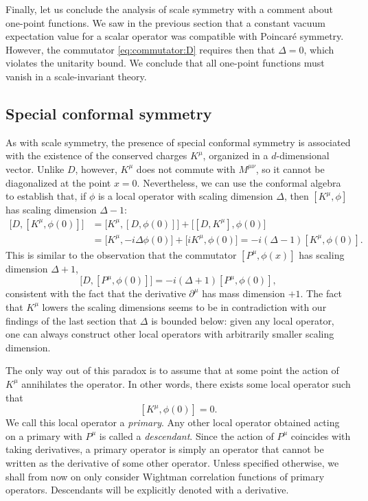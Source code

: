\documentclass[a4paper,12pt]{article}
\numberwithin{equation}{section}
\begin{document}
Finally, let us conclude the analysis of scale symmetry with a comment about one-point functions. We saw in the previous section that a constant vacuum expectation value for a scalar operator was compatible with Poincaré symmetry. However, the commutator \eqref{eq:commutator:D} requires then that $\Delta = 0$, which violates the unitarity bound.
We conclude that all one-point functions must vanish in a scale-invariant theory.


\subsection{Special conformal symmetry}

As with scale symmetry, the presence of special conformal symmetry is associated with the existence of the conserved charges $K^\mu$, organized in a $d$-dimensional vector.
Unlike $D$, however, $K^\mu$ does not commute with $M^{\mu\nu}$, so it cannot be diagonalized at the point $x = 0$.
Nevertheless, we can use the conformal algebra to establish that, if $\phi$ is a local operator with scaling dimension $\Delta$, then $\left[ K^\mu, \phi \right]$ has scaling dimension $\Delta - 1$:
\begin{align}
	\big[ D, [ K^\mu, \phi(0) ] \big]
	&= \big[ K^\mu, [ D, \phi(0) ] \big]
	+ \big[ [ D, K^\mu ], \phi(0) \big]
	\nonumber \\
	&= \big[ K^\mu, -i \Delta \phi(0) \big]
	+ \big[ i K^\mu, \phi(0) \big]
	= -i (\Delta - 1) [ K^\mu, \phi(0) ].
\end{align}
This is similar to the observation that the commutator $\left[P^\mu, \phi(x)\right]$ has scaling dimension $\Delta + 1$,
\begin{equation}
	\big[ D, [ P^\mu, \phi(0) ] \big]
	= -i (\Delta + 1) [ P^\mu, \phi(0) ],
\end{equation}
consistent with the fact that the derivative $\partial^\mu$ has mass dimension $+1$.
The fact that $K^\mu$ lowers the scaling dimensions seems to be in contradiction with our findings of the last section that $\Delta$ is bounded below: given any local operator, one can always construct other local operators with arbitrarily smaller scaling dimension.

The only way out of this paradox is to assume that at some point the action of $K^\mu$ annihilates the operator. In other words, there exists some local operator such that
\begin{equation}
	\left[ K^\mu, \phi(0) \right] = 0.
\end{equation}
We call this local operator a \emph{primary}. Any other local operator obtained acting on a primary with $P^\mu$ is called a \emph{descendant}. Since the action of $P^\mu$ coincides with taking derivatives, a primary operator is simply an operator that cannot be written as the derivative of some other operator.
Unless specified otherwise, we shall from now on only consider Wightman correlation functions of primary operators. Descendants will be explicitly denoted with a derivative.
\end{document}
